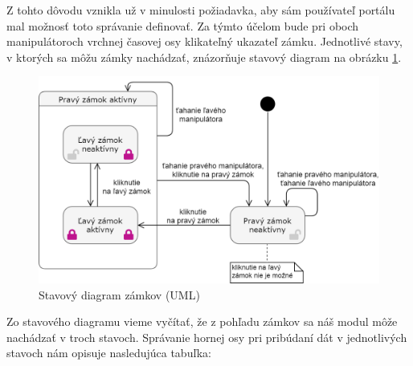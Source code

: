 \documentclass[
  digital, %
  twoside, %
  notable,   %
  nolof,   %
  nolot,   %
]{fithesis3}
\begin{document}
Z tohto dôvodu vznikla už v minulosti požiadavka, aby sám používateľ portálu mal možnosť toto správanie definovať. Za týmto účelom bude pri oboch manipulátoroch vrchnej časovej osy klikateľný ukazateľ zámku. Jednotlivé stavy, v ktorých sa môžu zámky nachádzať, znázorňuje stavový diagram na obrázku \ref{state_diagram}.

\begin{figure}[H]
	\center
	\includegraphics[width=1.0\linewidth]{state_diagram}
	\caption{Stavový diagram zámkov (UML)}
	\label{state_diagram}
\end{figure}

Zo stavového diagramu vieme vyčítať, že z pohľadu zámkov sa náš modul môže nachádzať v troch stavoch. Správanie hornej osy pri pribúdaní dát v jednotlivých stavoch nám opisuje nasledujúca tabuľka:
\end{document}
